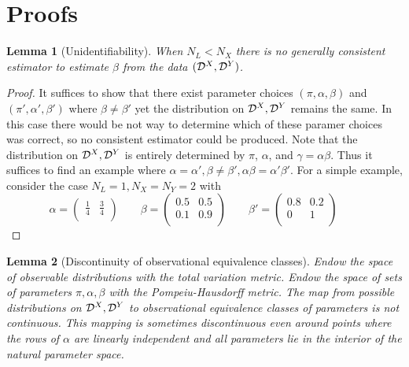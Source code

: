 \documentclass{article}
\newtheorem*{lemma*}{Lemma}
\theoremstyle{definition}
\begin{document}


\section{Proofs}
\label{sec:proofs}

\begin{lemma*}[Unidentifiability]  When $N_L<N_X$ there is no generally consistent estimator to estimate $\beta$ from the data $(\mathcal{D}^X,\mathcal{D}^Y)$. 
\end{lemma*}

\begin{proof}
    It suffices to show that there exist parameter choices $(\pi,\alpha,\beta)$ and $(\pi',\alpha',\beta')$ where $\beta\neq\beta'$ yet the distribution on $\mathcal{D}^X,\mathcal{D}^Y$ remains the same.  In this case there would be not way to determine which of these paramer choices was correct, so no consistent estimator could be produced.  Note that the distribution on $\mathcal{D}^X,\mathcal{D}^Y$ is entirely determined by $\pi$, $\alpha$, and $\gamma=\alpha\beta$.  Thus it suffices to find an example where $\alpha=\alpha',\beta\neq\beta',\alpha\beta=\alpha'\beta'$.  For a simple example, consider the case $N_L=1,N_X=N_Y=2$ with
    \[
    \alpha=\left(
        \begin{array}{cc}
        \frac{1}{4} & \frac{3}{4}\\
        \end{array}
    \right) \qquad
    \beta=\left(
        \begin{array}{cc}
        0.5 & 0.5\\
        0.1 & 0.9\\
        \end{array}
    \right) \qquad
    \beta'=\left(
        \begin{array}{cc}
        0.8 & 0.2\\
        0 & 1\\
        \end{array}
    \right) \qquad
    \]
\end{proof}

\begin{lemma*}[Discontinuity of observational equivalence classes]  Endow the space of observable distributions with the total variation metric.  Endow the space of sets of parameters $\pi,\alpha,\beta$ with the Pompeiu-Hausdorff metric.  The map from possible distributions on $\mathcal{D}^X,\mathcal{D}^Y$ to observational equivalence classes of parameters is not continuous.   This mapping is sometimes discontinuous even around points where the rows of $\alpha$ are linearly independent and all parameters lie in the interior of the natural parameter space.  
\end{lemma*}
\end{document}

